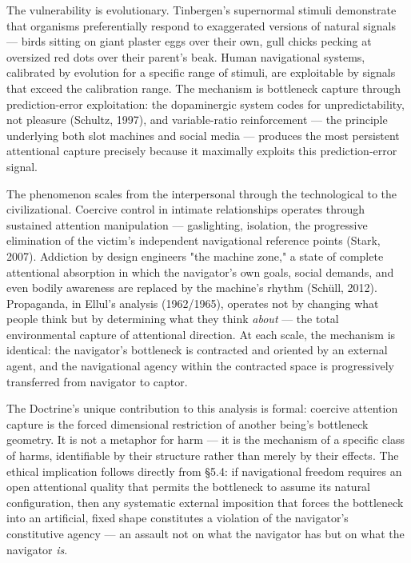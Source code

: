 The vulnerability is evolutionary. Tinbergen's supernormal stimuli demonstrate that organisms preferentially respond to exaggerated versions of natural signals — birds sitting on giant plaster eggs over their own, gull chicks pecking at oversized red dots over their parent's beak. Human navigational systems, calibrated by evolution for a specific range of stimuli, are exploitable by signals that exceed the calibration range. The mechanism is bottleneck capture through prediction-error exploitation: the dopaminergic system codes for unpredictability, not pleasure (Schultz, 1997), and variable-ratio reinforcement — the principle underlying both slot machines and social media — produces the most persistent attentional capture precisely because it maximally exploits this prediction-error signal.


The phenomenon scales from the interpersonal through the technological to the civilizational. Coercive control in intimate relationships operates through sustained attention manipulation — gaslighting, isolation, the progressive elimination of the victim's independent navigational reference points (Stark, 2007). Addiction by design engineers "the machine zone," a state of complete attentional absorption in which the navigator's own goals, social demands, and even bodily awareness are replaced by the machine's rhythm (Schüll, 2012). Propaganda, in Ellul's analysis (1962/1965), operates not by changing what people think but by determining what they think \textit{about} — the total environmental capture of attentional direction. At each scale, the mechanism is identical: the navigator's bottleneck is contracted and oriented by an external agent, and the navigational agency within the contracted space is progressively transferred from navigator to captor.


The Doctrine's unique contribution to this analysis is formal: coercive attention capture is the forced dimensional restriction of another being's bottleneck geometry. It is not a metaphor for harm — it is the mechanism of a specific class of harms, identifiable by their structure rather than merely by their effects. The ethical implication follows directly from §5.4: if navigational freedom requires an open attentional quality that permits the bottleneck to assume its natural configuration, then any systematic external imposition that forces the bottleneck into an artificial, fixed shape constitutes a violation of the navigator's constitutive agency — an assault not on what the navigator has but on what the navigator \textit{is}.


